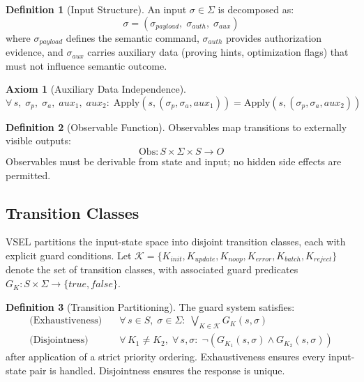 \documentclass[11pt,a4paper]{article}
\theoremstyle{definition}
\newtheorem{definition}{Definition}[section]
\newtheorem{axiom}{Axiom}[section]
\newcommand{\Apply}{\mathrm{Apply}}
\newcommand{\Obs}{\mathrm{Obs}}
\begin{document}
\begin{definition}[Input Structure]
\label{def:input-structure}
An input $\sigma \in \Sigma$ is decomposed as:
\begin{equation}
\sigma = (\sigma_{\mathit{payload}},\; \sigma_{\mathit{auth}},\; \sigma_{\mathit{aux}})
\end{equation}
where $\sigma_{\mathit{payload}}$ defines the semantic command, $\sigma_{\mathit{auth}}$ provides authorization evidence, and $\sigma_{\mathit{aux}}$ carries auxiliary data (proving hints, optimization flags) that must not influence semantic outcome.
\end{definition}

\begin{axiom}[Auxiliary Data Independence]
\label{ax:aux-independence}
\begin{equation}
\forall\, s,\; \sigma_p,\; \sigma_a,\; \mathit{aux}_1,\; \mathit{aux}_2:\;
\Apply(s, (\sigma_p, \sigma_a, \mathit{aux}_1)) = \Apply(s, (\sigma_p, \sigma_a, \mathit{aux}_2))
\end{equation}
\end{axiom}

\begin{definition}[Observable Function]
\label{def:observable}
Observables map transitions to externally visible outputs:
\begin{equation}
\Obs: S \times \Sigma \times S \to O
\end{equation}
Observables must be derivable from state and input; no hidden side effects are permitted.
\end{definition}

\subsection{Transition Classes}
\label{subsec:transition-classes}

VSEL partitions the input-state space into disjoint transition classes, each with explicit guard conditions. Let $\mathcal{K} = \{K_{\mathit{init}}, K_{\mathit{update}}, K_{\mathit{noop}}, K_{\mathit{error}}, K_{\mathit{batch}}, K_{\mathit{reject}}\}$ denote the set of transition classes, with associated guard predicates $G_K: S \times \Sigma \to \{\mathit{true}, \mathit{false}\}$.

\begin{definition}[Transition Partitioning]
\label{def:transition-partitioning}
The guard system satisfies:
\begin{align}
\text{(Exhaustiveness)} &\quad \forall\, s \in S,\; \sigma \in \Sigma:\; \bigvee_{K \in \mathcal{K}} G_K(s, \sigma) \label{eq:exhaustive} \\
\text{(Disjointness)} &\quad \forall\, K_1 \neq K_2,\; \forall\, s, \sigma:\; \neg(G_{K_1}(s, \sigma) \land G_{K_2}(s, \sigma)) \label{eq:disjoint}
\end{align}
after application of a strict priority ordering. Exhaustiveness ensures every input-state pair is handled. Disjointness ensures the response is unique.
\end{definition}
\end{document}
